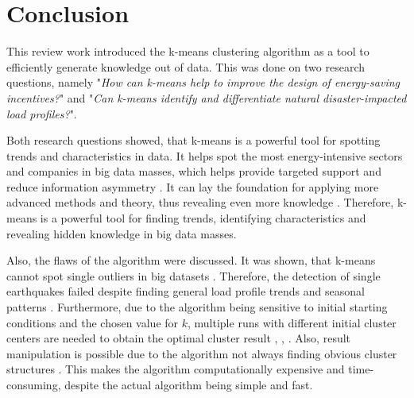 \chapter{Conclusion}
\label{cha:conclusion}



This review work introduced the k-means clustering algorithm as a tool to efficiently generate knowledge out of data.
This was done on two research questions, namely "\textit{How can k-means help to improve the design of energy-saving incentives?}" and "\textit{Can k-means identify and differentiate natural disaster-impacted load profiles?}".

Both research questions showed, that k-means is a powerful tool for spotting trends and characteristics in data.
It helps spot the most energy-intensive sectors and companies in big data masses, which helps provide targeted support and reduce information asymmetry \cite{LIU-BDE}.
It can lay the foundation for applying more advanced methods and theory, thus revealing even more knowledge \cite{MAL-HBP}.
Therefore, k-means is a powerful tool for finding trends, identifying characteristics and revealing hidden knowledge in big data masses.

Also, the flaws of the algorithm were discussed.
It was shown, that k-means cannot spot single outliers in big datasets \cite{JES-IND}.
Therefore, the detection of single earthquakes failed despite finding general load profile trends and seasonal patterns \cite{JES-IND}.
Furthermore, due to the algorithm being sensitive to initial starting conditions and the chosen value for $k$, multiple runs with different initial cluster centers are needed to obtain the optimal cluster result \cite{JAI-DCB}, \cite{EZU-CPF}, \cite{BAR-LVG}.
Also, result manipulation is possible due to the algorithm not always finding obvious cluster structures \cite{BOU-RPK}.
This makes the algorithm computationally expensive and time-consuming, despite the actual algorithm being simple and fast.

